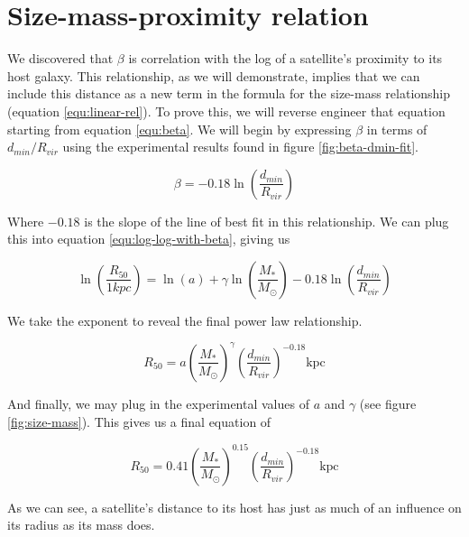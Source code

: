 
\section{Size-mass-proximity relation}

We discovered that $\beta$ is correlation with the log of a satellite's proximity to its host galaxy. This relationship, as we will demonstrate, implies that we can include this distance as a new term in the formula for the size-mass relationship (equation \ref{equ:linear-rel}). To prove this, we will reverse engineer that equation starting from equation \ref{equ:beta}. We will begin by expressing $\beta$ in terms of $d_{min} / R_{vir}$ using the experimental results found in figure \ref{fig:beta-dmin-fit}.

\begin{equation}
    \beta = -0.18 \ln\left( \frac{d_{min}}{R_{vir}} \right)
\end{equation}

Where $-0.18$ is the slope of the line of best fit in this relationship. We can plug this into equation \ref{equ:log-log-with-beta}, giving us

\begin{equation}
    \ln \left(
        \frac{R_{50}}{1 kpc}
    \right)
    =
    \ln(a)
    + \gamma \ln \left(
        \frac{M_*}{M_\odot}
    \right)
    -0.18 \ln\left( \frac{d_{min}}{R_{vir}} \right)
\end{equation}

We take the exponent to reveal the final power law relationship.

\begin{equation}
    R_{50} = a
    \left( \frac{M_*}{M_\odot} \right)^\gamma
    \left( \frac{d_{min}}{R_{vir}} \right)^{-0.18}
    \text{kpc}
\end{equation}

And finally, we may plug in the experimental values of $a$ and $\gamma$ (see figure \ref{fig:size-mass}). This gives us a final equation of 

\begin{equation}
    R_{50} = 0.41
    \left( \frac{M_*}{M_\odot} \right)^{0.15}
    \left( \frac{d_{min}}{R_{vir}} \right)^{-0.18}
    \text{kpc}
\end{equation}

As we can see, a satellite's distance to its host has just as much of an influence on its radius as its mass does. 


